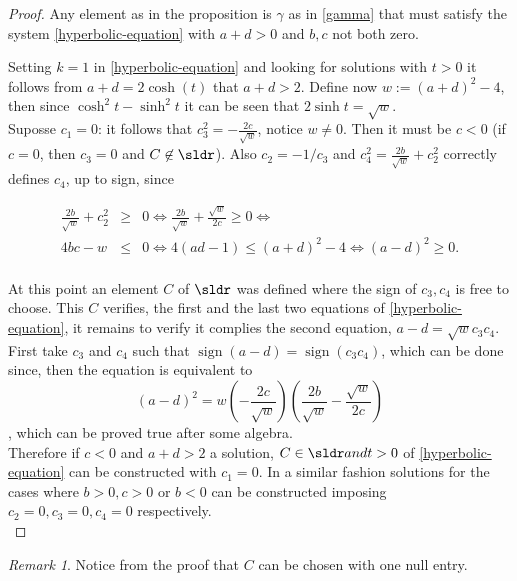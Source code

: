 \documentclass[11pt]{amsart}
\DeclareMathOperator{\sign}{sign} %
\theoremstyle{plain}
\theoremstyle{definition}
\theoremstyle{remark}
\newtheorem{rem}{Remark}
\begin{document}
\begin{proof}
Any element as in the proposition is $\gamma$ as in \eqref{gamma} that must satisfy the system \eqref{hyperbolic-equation} with $a+d>0$ and $b,c$ not both zero.

Setting $k=1$ in \eqref{hyperbolic-equation} and looking for solutions with $t>0$ it follows from $a+d = 2 \cosh{(t)}$ that $a+d >2$. Define now $w:=(a+d)^2-4$, then since $\cosh^2{t} - \sinh^2{t}$ it can be seen that $2\sinh{t}=\sqrt{w}$.\\

Suposse $c_1 = 0$: it follows that $c_3^2 = - \frac{2 c}{\sqrt{w}}$, notice $w \neq 0$. Then it must be $c<0$ (if $c=0$, then $c_3=0$ and $C \not\in \sldr$). Also $c_2=-1/c_3$ and $c_4^2 = \frac{2 b}{\sqrt{w}}+c_2^2$ correctly defines $c_4$, up to sign, since

\begin{eqnarray*}
\frac{2 b}{\sqrt{w}}+c_2^2 &\geq& 0 \iff \frac{2 b}{\sqrt{w}}+\frac{\sqrt{w}}{2c} \geq 0 \iff \\
4bc-w &\leq& 0 \iff 4(ad-1) \leq (a+d)^2-4 \iff (a-d)^2 \geq 0. \\
\end{eqnarray*}

At this point an element $C$ of $\sldr$ was defined where the sign of $c_3, c_4$ is free to choose. This $C$ verifies, the first and the last two equations of \eqref{hyperbolic-equation}, it remains to verify it complies the second equation, $a-d = \sqrt{w} c_3 c_4$. First take $c_3$ and $c_4$ such that $\sign(a-d)=\sign(c_3 c_4)$, which can be done since, then the equation is equivalent to $$(a-d)^2=w (-\frac{2c}{\sqrt{w}}) (\frac{2b}{\sqrt{w}}-\frac{\sqrt{w}}{2c})$$, which can be proved true after some algebra.\\

Therefore if $c<0$ and $a+d>2$ a solution, $C \in \sldr and t>0$ of \eqref{hyperbolic-equation} can be constructed with $c_1 = 0$. In a similar fashion solutions for the cases where $b >0, c>0$ or $b<0$ can be constructed imposing $c_2 = 0, c_3 = 0, c_4 = 0$ respectively. \\

\end{proof}

\begin{rem}
Notice from the proof that $C$ can be chosen with one null entry.
\end{rem}
\end{document}
